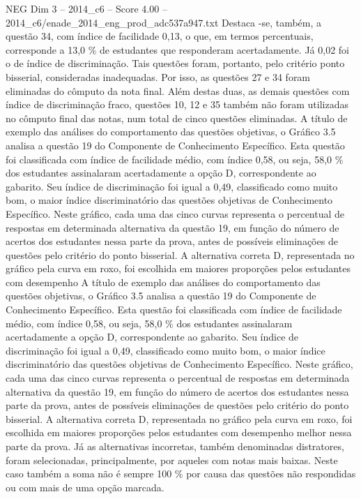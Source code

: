 \begin{textsample}{NEG Dim 3 – 2014\_c6 – Score 4.00 – 2014\_c6/enade\_2014\_eng\_prod\_adc537a947.txt}
Destaca -se, também, a questão 34, com índice de facilidade 0,13, o que, em termos percentuais, corresponde a 13,0 \% de estudantes que responderam acertadamente.
Já 0,02 foi o de índice de discriminação.
Tais questões foram, portanto, pelo critério ponto bisserial, consideradas inadequadas.
Por isso, as questões 27 e 34 foram eliminadas do cômputo da nota final.
Além destas duas, as demais questões com índice de discriminação fraco, questões 10, 12 e 35 também não foram utilizadas no cômputo final das notas, num total de cinco questões eliminadas.
A título de exemplo das análises do comportamento das questões objetivas, o Gráfico 3.5 analisa a questão 19 do Componente de Conhecimento Específico.
Esta questão foi classificada com índice de facilidade médio, com índice 0,58, ou seja, 58,0 \% dos estudantes assinalaram acertadamente a opção D, correspondente ao gabarito.
Seu índice de discriminação foi igual a 0,49, classificado como muito bom, o maior índice discriminatório das questões objetivas de Conhecimento Específico.
Neste gráfico, cada uma das cinco curvas representa o percentual de respostas em determinada alternativa da questão 19, em função do número de acertos dos estudantes nessa parte da prova, antes de possíveis eliminações de questões pelo critério do ponto bisserial.
A alternativa correta D, representada no gráfico pela curva em roxo, foi escolhida em maiores proporções pelos estudantes com desempenho A título de exemplo das análises do comportamento das questões objetivas, o Gráfico 3.5 analisa a questão 19 do Componente de Conhecimento Específico.
Esta questão foi classificada com índice de facilidade médio, com índice 0,58, ou seja, 58,0 \% dos estudantes assinalaram acertadamente a opção D, correspondente ao gabarito.
Seu índice de discriminação foi igual a 0,49, classificado como muito bom, o maior índice discriminatório das questões objetivas de Conhecimento Específico.
Neste gráfico, cada uma das cinco curvas representa o percentual de respostas em determinada alternativa da questão 19, em função do número de acertos dos estudantes nessa parte da prova, antes de possíveis eliminações de questões pelo critério do ponto bisserial.
A alternativa correta D, representada no gráfico pela curva em roxo, foi escolhida em maiores proporções pelos estudantes com desempenho melhor nessa parte da prova.
Já as alternativas incorretas, também denominadas distratores, foram selecionadas, principalmente, por aqueles com notas mais baixas.
Neste caso também a soma não é sempre 100 \% por causa das questões não respondidas ou com mais de uma opção marcada.

\end{textsample}
